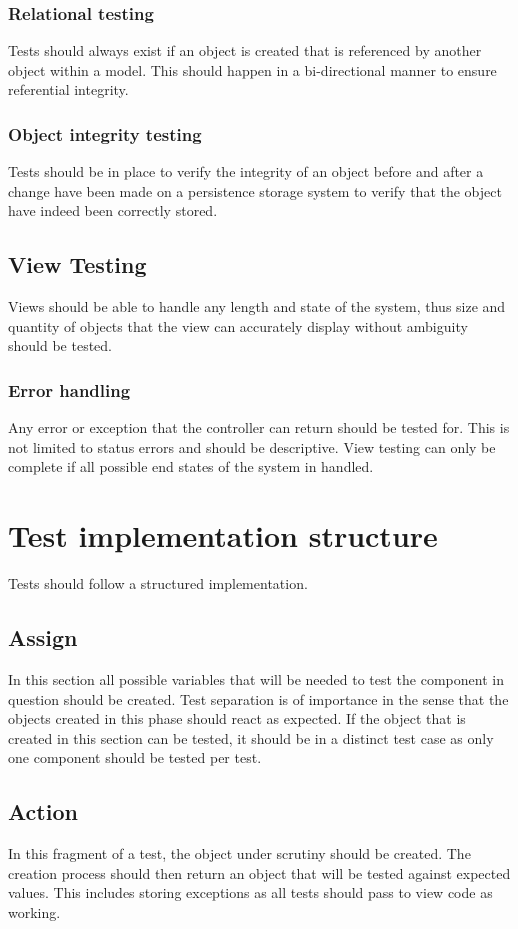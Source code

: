 \documentclass[12pt]{article}
\begin{document}
\subsubsection{Relational testing}
Tests should always exist if an object is created that is referenced by
another object within a model. This should happen in a bi-directional
manner to ensure referential integrity.

\subsubsection{Object integrity testing}
Tests should be in place to verify the integrity of an object before and
after a change have been made on a persistence storage system to verify that
the object have indeed been correctly stored.

\subsection{View Testing}
Views should be able to handle any length and state of the system, thus size
and quantity of objects that the view can accurately display without ambiguity should be tested.

\subsubsection{Error handling}
Any error or exception that the controller can return should be tested for.
This is not limited to status errors and should be descriptive. View testing
can only be complete if all possible end states of the system in handled.

\section{Test implementation structure}
Tests should follow a structured implementation.

\subsection{Assign}
In this section all possible variables that will be needed to test the
component in question should be created. Test separation is of importance in
the sense that the objects created in this phase should react as expected. If
the object that is created in this section can be tested, it should be in a
distinct test case as only one component should be tested per test. 

\subsection{Action}
In this fragment of a test, the object under scrutiny should be created. The
creation process should then return an object that will be tested against
expected values. This includes storing exceptions as all tests should pass to view code as working. 
\end{document}
